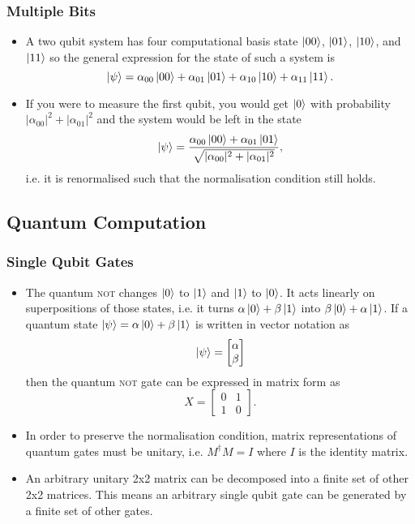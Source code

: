 \documentclass{article}
\begin{document}
\subsubsection{Multiple Bits}

\begin{itemize}
  \item A two qubit system has four computational basis state $\ket{00}$, $\ket{01}$, $\ket{10}$, and $\ket{11}$ so the general expression for the state of such a system is \[\ket{\psi} = \alpha_{00} \ket{00} + \alpha_{01} \ket{01} + \alpha_{10} \ket{10} + \alpha_{11} \ket{11}.\]

  \item If you were to measure the first qubit, you would get $\ket{0}$ with probability $|\alpha_{00}|^2 + |\alpha_{01}|^2$ and the system would be left in the state \[\ket{\psi} = \frac{\alpha_{00} \ket{00} + \alpha_{01} \ket{01}}{\sqrt{|\alpha_{00}|^2 + |\alpha_{01}|^2}},\] i.e. it is renormalised such that the normalisation condition still holds.
\end{itemize}

\subsection{Quantum Computation}

\subsubsection{Single Qubit Gates}

\begin{itemize}
  \item The quantum \textsc{not} changes $\ket{0}$ to $\ket{1}$ and $\ket{1}$ to $\ket{0}$. It acts linearly on superpositions of those states, i.e. it turns $\alpha \ket{0} + \beta \ket{1}$ into $\beta \ket{0} + \alpha \ket{1}$. If a quantum state $\ket{\psi} = \alpha \ket{0} + \beta \ket{1}$ is written in vector notation as \[\ket{\psi} = \begin{bmatrix}
            \alpha \\
            \beta
          \end{bmatrix}\] then the quantum \textsc{not} gate can be expressed in matrix form as \[X = \begin{bmatrix}
            0 & 1 \\
            1 & 0
          \end{bmatrix}.\]

  \item In order to preserve the normalisation condition, matrix representations of quantum gates must be unitary, i.e. $M^\dagger M = I$ where $I$ is the identity matrix.

  \item An arbitrary unitary 2x2 matrix can be decomposed into a finite set of other 2x2 matrices. This means an arbitrary single qubit gate can be generated by a finite set of other gates.
\end{itemize}
\end{document}
